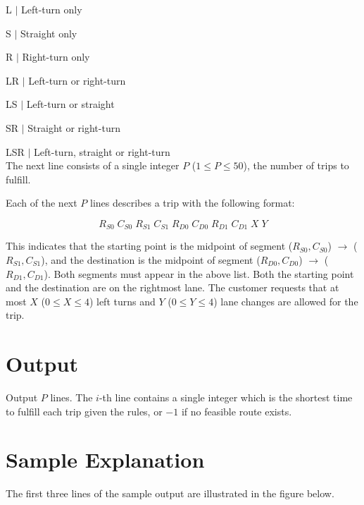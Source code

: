   L   $\mid$ Left-turn only

  S   $\mid$ Straight only

  R   $\mid$ Right-turn only

  LR  $\mid$ Left-turn or right-turn

  LS  $\mid$ Left-turn or straight

  SR  $\mid$ Straight or right-turn

 LSR  $\mid$ Left-turn, straight or right-turn\\

The next line consists of a single integer $P$ ($1 \leq P \leq 50$), the number of trips to fulfill.

Each of the next $P$ lines describes a trip with the following format:

$$R_{S0}\;C_{S0}\;R_{S1}\;C_{S1}\;R_{D0}\;C_{D0}\;R_{D1}\;C_{D1}\;X\;Y$$

This indicates that the starting point is the midpoint of segment ($R_{S0}, C_{S0}$) $\to$ ($R_{S1}, C_{S1}$), and the destination is the midpoint of segment ($R_{D0}, C_{D0}$) $\to$ ($R_{D1}, C_{D1}$). Both segments must appear in the above list. Both the starting point and the destination are on the rightmost lane. The customer requests that at most $X$ ($0 \leq X \leq 4$) left turns and $Y$ ($0 \leq Y \leq 4$) lane changes are allowed for the trip.

\section*{Output}

Output $P$ lines. The $i$-th line contains a single integer which is the shortest time to fulfill each trip given the rules, or $-1$ if no feasible route exists.

\section*{Sample Explanation}

The first three lines of the sample output are illustrated in the figure below.

